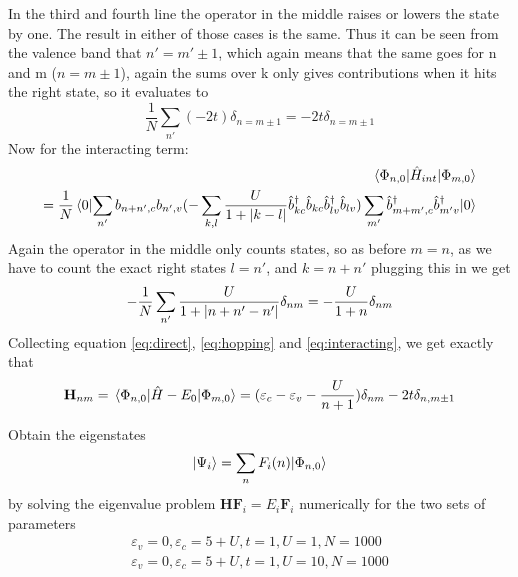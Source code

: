\begin{solution}
\begin{equation}
 \end{equation}
 In the third and fourth line the operator in the middle raises or lowers  the state by one.  The result in either of those cases is the same. Thus it can be seen from the valence band that $n' = m' \pm 1$, which again means that the same goes for n and m ($n = m \pm 1$), again the sums over k only gives contributions when it hits the right state, so it evaluates to
 \begin{equation}
     \frac{1}{N} \sum_{n'} (-2t) \delta_{n= m \pm 1} = - 2t \delta_{n=m \pm 1}
     \label{eq:hopping}
 \end{equation}
 Now for the interacting term:
 \begin{equation}
 \begin{split}
     \mel{\Phi_{n,0}}{\hat{H}_{int}}{\Phi_{m,0}} \\
     =  \frac{1}{N}\mel{0}{\sum_{n'}b_{n+n',c}b_{n',v} (-\sum_{k,l} \frac{U}{1+ \abs{k-l}} \hat{b}_{kc}^{\dagger} \hat{b}_{kc} \hat{b}_{lv}^{\dagger} \hat{b}_{lv}) \sum_{m'} \hat{b}_{m+m',c}^{\dagger} \hat{b}_{m'v}^{\dagger}}{0}
     \end{split}
 \end{equation}
 Again the operator in the middle only counts states, so as before $m = n$, as we have to count the exact right states $l = n'$, and $k = n+n'$
 plugging this in we get
 \begin{equation}
     - \frac{1}{N} \sum_{n'} \frac{U}{1+ \abs{n+n' - n'}} \delta_{nm} = -\frac{U}{1+n} \delta_{nm}
     \label{eq:interacting}
 \end{equation}
 Collecting equation \eqref{eq:direct}, \eqref{eq:hopping} and \eqref{eq:interacting}, we get exactly that
 \begin{equation}
         \mathbf{H}_{nm} = \mel{\Phi_{n,0}}{\hat{H}-E_0}{\Phi_{m,0}} = (\varepsilon_c-\varepsilon_v - \frac{U}{n+1})\delta_{nm} - 2 t \delta_{n,m\pm1}
 \end{equation}
 \end{solution}
 
 \begin{exercise}
 Obtain the eigenstates
 \begin{equation}
     |\Psi_i\rangle = \sum_n F_i(n) |\Phi_{n,0}\rangle
 \end{equation}
 by solving the eigenvalue problem $\mathbf{H F}_i = E_i \mathbf{F}_i$ numerically for the two sets of parameters 
 \begin{equation}
 \begin{split}
     \varepsilon_v=0, \varepsilon_c = 5+U, t=1, U =1, N=1000 \\
    \varepsilon_v=0, \varepsilon_c = 5+U, t=1, U =10, N=1000
      \end{split}
 \end{equation}
 \end{exercise}
 
